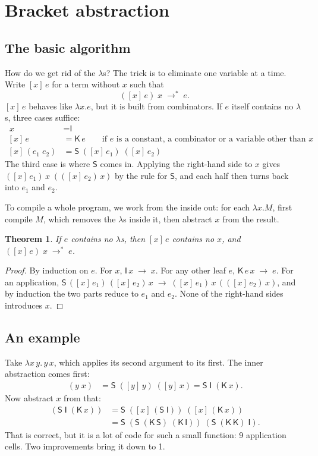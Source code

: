 \documentclass[11pt,a4paper]{article}
\newcommand{\cmb}[1]{\textsf{#1}}
\newcommand{\I}{\cmb{I}}
\newcommand{\K}{\cmb{K}}
\newcommand{\Sc}{\cmb{S}}
\newcommand{\abs}[2]{[#1]\,#2}
\newcommand{\red}{\;\to\;}
\newcommand{\reds}{\;\to^{*}\;}
\theoremstyle{definition}
\theoremstyle{plain}
\newtheorem{theorem}{Theorem}
\begin{document}
\section{Bracket abstraction}\label{sec:abstraction}

\subsection{The basic algorithm}

How do we get rid of the $\lambda$s? The trick is to eliminate one variable at
a time. Write $\abs{x}{e}$ for a term without $x$ such that
\[
  (\abs{x}{e})\;x \reds e.
\]
$\abs{x}{e}$ behaves like $\lambda x.e$, but it is built from combinators. If
$e$ itself contains no $\lambda$s, three cases suffice:
\begin{align*}
  \abs{x}{x} &= \I\\
  \abs{x}{e} &= \K\,e \qquad\text{if $e$ is a constant, a combinator or a variable other than $x$}\\
  \abs{x}{(e_1\;e_2)} &= \Sc\;(\abs{x}{e_1})\;(\abs{x}{e_2})
\end{align*}
The third case is where $\Sc$ comes in. Applying the right-hand side to $x$
gives $(\abs{x}{e_1})\,x\;((\abs{x}{e_2})\,x)$ by the rule for $\Sc$, and each
half then turns back into $e_1$ and $e_2$.

To compile a whole program, we work from the inside out: for each $\lambda x.M$,
first compile $M$, which removes the $\lambda$s inside it, then abstract $x$
from the result.

\begin{theorem}\label{thm:abs}
If $e$ contains no $\lambda$s, then $\abs{x}{e}$ contains no $x$, and
$(\abs{x}{e})\;x \reds e$.
\end{theorem}

\begin{proof}
By induction on $e$. For $x$, $\I\,x \red x$. For any other leaf $e$,
$\K\,e\,x \red e$. For an application,
$\Sc\,(\abs{x}{e_1})\,(\abs{x}{e_2})\,x \red (\abs{x}{e_1})\,x\,((\abs{x}{e_2})\,x)$,
and by induction the two parts reduce to $e_1$ and $e_2$. None of the
right-hand sides introduces $x$.
\end{proof}

\subsection{An example}

Take $\lambda x\,y.\,y\,x$, which applies its second argument to its first.
The inner abstraction comes first:
\begin{align*}
  \abs{y}{(y\;x)} &= \Sc\;(\abs{y}{y})\;(\abs{y}{x}) = \Sc\;\I\;(\K\,x).
\end{align*}
Now abstract $x$ from that:
\begin{align*}
  \abs{x}{(\Sc\;\I\;(\K\,x))}
  &= \Sc\;(\abs{x}{(\Sc\;\I)})\;(\abs{x}{(\K\,x)})\\
  &= \Sc\;(\Sc\;(\K\,\Sc)\;(\K\,\I))\;(\Sc\;(\K\,\K)\;\I).
\end{align*}
That is correct, but it is a lot of code for such a small function: 9
application cells. Two improvements bring it down to 1.
\end{document}
